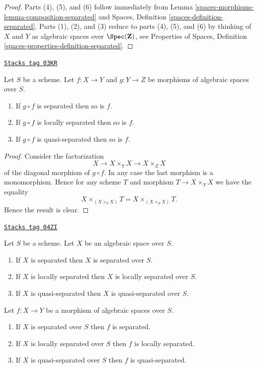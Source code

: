 \begin{proof}
Parts (4), (5), and (6) follow immediately from
Lemma \ref{spaces-morphisms-lemma-composition-separated}
and
Spaces, Definition \ref{spaces-definition-separated}.
Parts (1), (2), and (3) reduce to parts (4), (5), and (6) by thinking
of $X$ and $Y$ as algebraic spaces over $\Spec(\mathbf{Z})$, see
Properties of Spaces, Definition \ref{spaces-properties-definition-separated}.
\end{proof}

\begin{lemma}
\label{spaces-morphisms-lemma-compose-after-separated}
\href{https://stacks.math.columbia.edu/tag/03KR}{\texttt{Stacks tag 03KR}}

Let $S$ be a scheme.
Let $f : X \to Y$ and $g : Y \to Z$ be morphisms of algebraic spaces over $S$.
\begin{enumerate}
\item If $g \circ f$ is separated then so is $f$.
\item If $g \circ f$ is locally separated then so is $f$.
\item If $g \circ f$ is quasi-separated then so is $f$.
\end{enumerate}
\end{lemma}

\begin{proof}
Consider the factorization
$$
X \to X \times_Y X \to X \times_Z X
$$
of the diagonal morphism of $g \circ f$. In any case the last morphism
is a monomorphism. Hence for any scheme $T$ and morphism
$T \to X \times_Y X$ we have the equality
$$
X \times_{(X \times_Y X)} T = X \times_{(X \times_Z X)} T.
$$
Hence the result is clear.
\end{proof}

\begin{lemma}
\label{spaces-morphisms-lemma-separated-implies-morphism-separated}
\href{https://stacks.math.columbia.edu/tag/04ZI}{\texttt{Stacks tag 04ZI}}

Let $S$ be a scheme. Let $X$ be an algebraic space over $S$.
\begin{enumerate}
\item If $X$ is separated then $X$ is separated over $S$.
\item If $X$ is locally separated then $X$ is locally separated over $S$.
\item If $X$ is quasi-separated then $X$ is quasi-separated over $S$.
\end{enumerate}
Let $f : X \to Y$ be a morphism of algebraic spaces over $S$.
\begin{enumerate}
\item[(4)] If $X$ is separated over $S$ then $f$ is separated.
\item[(5)] If $X$ is locally separated over $S$ then $f$ is locally separated.
\item[(6)] If $X$ is quasi-separated over $S$ then $f$ is quasi-separated.
\end{enumerate}
\end{lemma}

